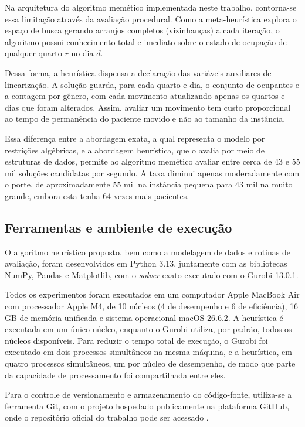 Na arquitetura do algoritmo memético implementada neste trabalho, contorna-se essa limitação através da avaliação procedural. Como a meta-heurística explora o espaço de busca gerando arranjos completos (vizinhanças) a cada iteração, o algoritmo possui conhecimento total e imediato sobre o estado de ocupação de qualquer quarto $r$ no dia $d$. 

Dessa forma, a heurística dispensa a declaração das variáveis auxiliares de linearização. A solução guarda, para cada quarto e dia, o conjunto de ocupantes e a contagem por gênero, com cada movimento atualizando apenas os quartos e dias que foram alterados. Assim, avaliar um movimento tem custo proporcional ao tempo de permanência do paciente movido e não ao tamanho da instância.

Essa diferença entre a abordagem exata, a qual representa o modelo por restrições algébricas, e a abordagem heurística, que o avalia por meio de estruturas de dados, permite ao algoritmo memético avaliar entre cerca de 43 e 55 mil soluções candidatas por segundo. A taxa diminui apenas moderadamente com o porte, de aproximadamente 55 mil na instância pequena para 43 mil na muito grande, embora esta tenha 64 vezes mais pacientes.


\subsection{Ferramentas e ambiente de execução}
\label{sec:ambiente}

O algoritmo heurístico proposto, bem como a modelagem de dados e rotinas de avaliação, foram desenvolvidos em Python 3.13, juntamente com as bibliotecas NumPy, Pandas e Matplotlib, com o \textit{solver} exato executado com o Gurobi 13.0.1.

Todos os experimentos foram executados em um computador Apple MacBook Air com processador Apple M4, de 10 núcleos (4 de desempenho e 6 de eficiência), 16 GB de memória unificada e sistema operacional macOS 26.6.2. A heurística é executada em um único núcleo, enquanto o Gurobi utiliza, por padrão, todos os núcleos disponíveis. Para reduzir o tempo total de execução, o Gurobi foi executado em dois processos simultâneos na mesma máquina, e a heurística, em quatro processos simultâneos, um por núcleo de desempenho, de modo que parte da capacidade de processamento foi compartilhada entre eles.

Para o controle de versionamento e armazenamento do código-fonte, utiliza-se a ferramenta Git, com o projeto hospedado publicamente na plataforma GitHub, onde o repositório oficial do trabalho pode ser acessado \cite{tavares2026repositorio}.


